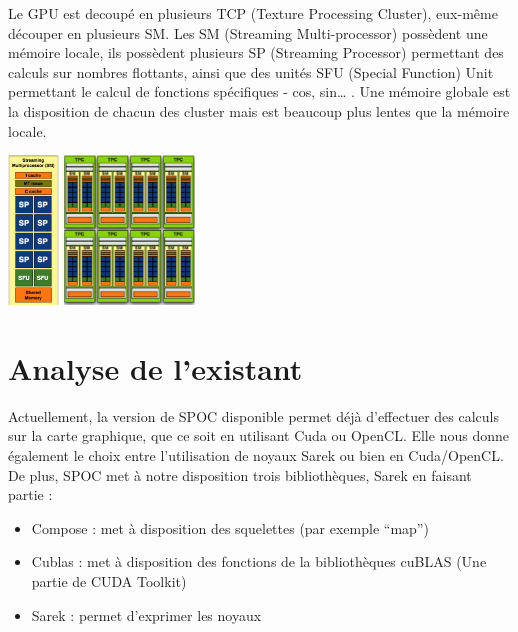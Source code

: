 \documentclass{report}
\begin{document}
Le GPU est decoupé en plusieurs TCP (Texture Processing Cluster), eux-même découper en plusieurs SM. Les SM (Streaming Multi-processor) possèdent une mémoire locale, ils possèdent plusieurs SP (Streaming Processor) permettant des calculs sur nombres flottants, ainsi que des unités SFU (Special Function) Unit permettant le calcul de fonctions spécifiques - cos, sin… . Une mémoire globale est la disposition de chacun des cluster mais est beaucoup plus lentes que la mémoire locale.

\includegraphics[height=150]{image00.png}
\includegraphics[height=150]{image01.png}


\section{Analyse de l'existant}
Actuellement, la version de SPOC disponible permet déjà d’effectuer des calculs sur la carte graphique, que ce soit en utilisant Cuda ou OpenCL. Elle nous donne également le choix entre l’utilisation de noyaux Sarek ou bien en Cuda/OpenCL. De plus, SPOC met à notre disposition trois bibliothèques, Sarek en faisant partie : 

\begin{itemize}

\item Compose : met à disposition des squelettes (par exemple “map”)
\item Cublas : met à disposition des fonctions de la bibliothèques cuBLAS (Une partie de CUDA Toolkit)
\item Sarek : permet d’exprimer les noyaux

\end{itemize}



\end{document}
